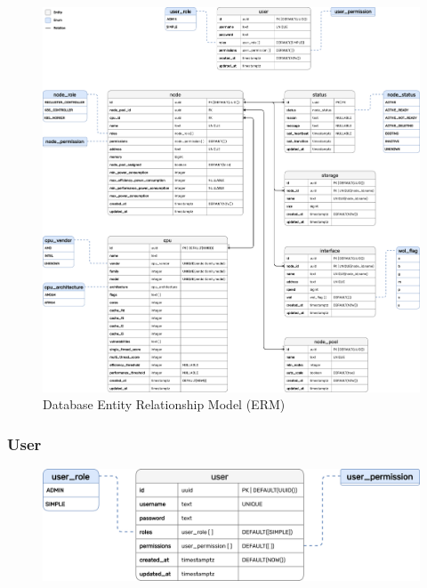 \begin{figure}[htbp]
  \centering
  \includegraphics[width=\linewidth]{images/implementation/erm.png}
  \caption{Database Entity Relationship Model (ERM)}
  \label{fig:erm}
\end{figure}

\pagebreak


\subsubsection{User}
\label{subsubsec:implementation_server_database_user}

\begin{figure}
  \centering
  \includegraphics[width=\linewidth]{images/implementation/erm_user.png}
\end{figure}

